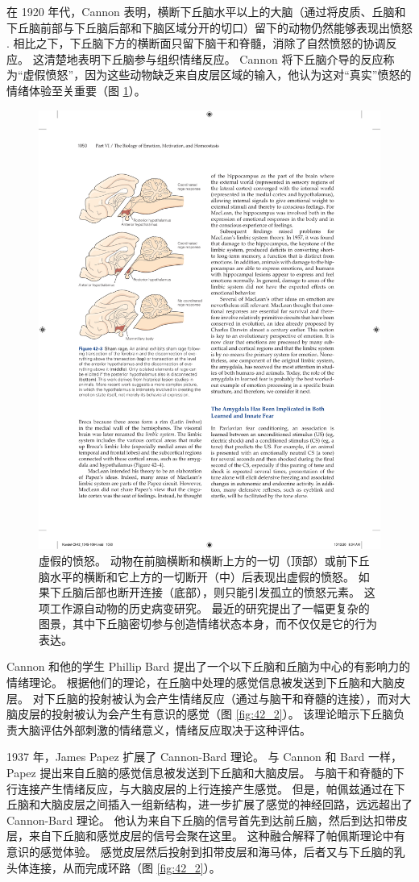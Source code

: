 在 1920 年代，Cannon 表明，横断下丘脑水平以上的大脑（通过将皮质、丘脑和下丘脑前部与下丘脑后部和下脑区域分开的切口）留下的动物仍然能够表现出愤怒 . 相比之下，下丘脑下方的横断面只留下脑干和脊髓，消除了自然愤怒的协调反应。 这清楚地表明下丘脑参与组织情绪反应。 
Cannon 将下丘脑介导的反应称为“虚假愤怒”，因为这些动物缺乏来自皮层区域的输入，他认为这对“真实”愤怒的情绪体验至关重要（图 \ref{fig:42_3}）。

\begin{figure}[htbp]
	\centering
	\includegraphics[width=0.5\linewidth]{chap42/fig_42_3}
	\caption{虚假的愤怒。 动物在前脑横断和横断上方的一切（顶部）或前下丘脑水平的横断和它上方的一切断开（中）后表现出虚假的愤怒。 如果下丘脑后部也断开连接（底部），则只能引发孤立的愤怒元素。 这项工作源自动物的历史病变研究。 最近的研究提出了一幅更复杂的图景，其中下丘脑密切参与创造情绪状态本身，而不仅仅是它的行为表达。}
	\label{fig:42_3}
\end{figure}

Cannon 和他的学生 Phillip Bard 提出了一个以下丘脑和丘脑为中心的有影响力的情绪理论。 根据他们的理论，在丘脑中处理的感觉信息被发送到下丘脑和大脑皮层。 对下丘脑的投射被认为会产生情绪反应（通过与脑干和脊髓的连接），而对大脑皮层的投射被认为会产生有意识的感觉（图 \ref{fig:42_2}）。 该理论暗示下丘脑负责大脑评估外部刺激的情绪意义，情绪反应取决于这种评估。

1937 年，James Papez 扩展了 Cannon-Bard 理论。 与 Cannon 和 Bard 一样，Papez 提出来自丘脑的感觉信息被发送到下丘脑和大脑皮层。 与脑干和脊髓的下行连接产生情绪反应，与大脑皮层的上行连接产生感觉。 但是，帕佩兹通过在下丘脑和大脑皮层之间插入一组新结构，进一步扩展了感觉的神经回路，远远超出了 Cannon-Bard 理论。 他认为来自下丘脑的信号首先到达前丘脑，然后到达扣带皮层，来自下丘脑和感觉皮层的信号会聚在这里。 这种融合解释了帕佩斯理论中有意识的感觉体验。 感觉皮层然后投射到扣带皮层和海马体，后者又与下丘脑的乳头体连接，从而完成环路（图 \ref{fig:42_2}）。

